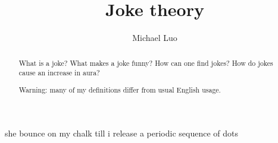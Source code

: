 \documentclass[11pt]{scrartcl}
\title{Joke theory}
\author{Michael Luo}
\begin{document}
\begin{abstract}
    What is a joke? What makes a joke funny? How can one find jokes? How do jokes cause an increase in aura?

    Warning: many of my definitions differ from usual English usage.
\end{abstract}

she bounce on my chalk till i release a periodic sequence of dots
\end{document}
